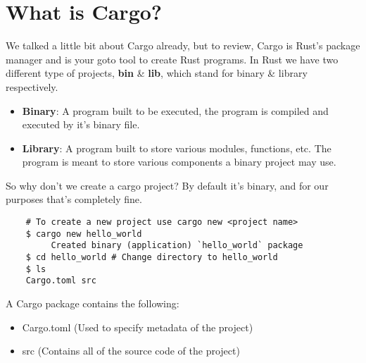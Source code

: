 \chapter{What is Cargo?}
\par We talked a little bit about Cargo already, but to review, Cargo is Rust's package manager and is your goto tool to create Rust programs. In Rust we have two different type of projects, \textbf{bin} \& \textbf{lib}, 
which stand for binary \& library respectively. 

\begin{itemize}
    \item \textbf{Binary}: A program built to be executed, the program is compiled and executed by it's binary file.
    \item \textbf{Library}: A program built to store various modules, functions, etc. The program is meant to store various components a binary project may use. 
\end{itemize}

\par \noindent So why don't we create a cargo project? By default it's binary, and for our purposes that's completely fine. 

\begin{verbatim}
    # To create a new project use cargo new <project name>
    $ cargo new hello_world
         Created binary (application) `hello_world` package
    $ cd hello_world # Change directory to hello_world 
    $ ls
    Cargo.toml src    
\end{verbatim}

\par \noindent A Cargo package contains the following: 

\begin{itemize}
    \item Cargo.toml (Used to specify metadata of the project)
    \item src (Contains all of the source code of the project)
\end{itemize}
